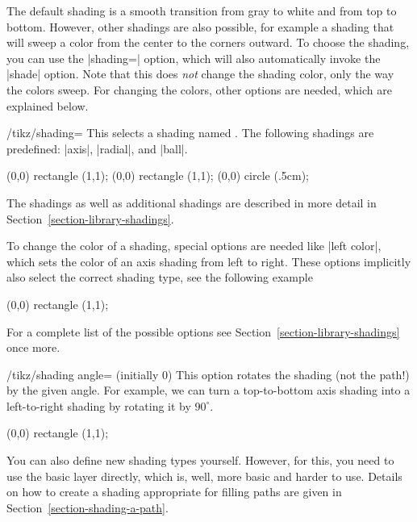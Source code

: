 The default shading is a smooth transition from gray
to white and from top to bottom. However, other shadings are also
possible, for example a shading that will sweep a color from the
center to the corners outward. To choose the shading, you can use the
|shading=| option, which will also automatically invoke the |shade|
option. Note that this does \emph{not} change the shading color, only
the way the colors sweep. For changing the colors, other options are
needed, which are explained below.

\begin{key}{/tikz/shading=}
  This selects a shading named . The following shadings are
  predefined: |axis|, |radial|, and |ball|.
\begin{codeexample}[]
\tikz \shadedraw [shading=axis] (0,0) rectangle (1,1);
\tikz \shadedraw [shading=radial] (0,0) rectangle (1,1);
\tikz \shadedraw [shading=ball] (0,0) circle (.5cm);
\end{codeexample}

  The shadings as well as additional shadings are described in more
  detail in Section~\ref{section-library-shadings}.

  To change the color of a shading, special options are needed like
  |left color|, which sets the color of an axis shading from left to
  right. These options implicitly also select the correct shading type,
  see the following example
\begin{codeexample}[]
\tikz \shadedraw [left color=red,right color=blue]
    (0,0) rectangle (1,1);
\end{codeexample}

  For a complete list of the possible options see
  Section~\ref{section-library-shadings} once more.

  \begin{key}{/tikz/shading angle= (initially 0)}
    This option rotates the shading (not the path!) by the given
    angle. For example, we can turn a top-to-bottom axis shading into a
    left-to-right shading by rotating it by $90^\circ$.

\begin{codeexample}[]
\tikz \shadedraw [shading=axis,shading angle=90] (0,0) rectangle (1,1);
\end{codeexample}
  \end{key}
\end{key}

You can also define new shading types yourself. However, for this, you
need to use the basic layer directly, which is, well, more basic and
harder to use. Details on how to create a shading appropriate for
filling paths are given in Section~\ref{section-shading-a-path}.



